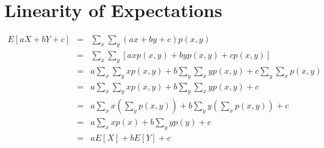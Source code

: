\documentclass[12pt]{article}
\begin{document}
\section*{Linearity of Expectations}
\begin{eqnarray*}
	E[aX+bY+c] &=& \sum_x \sum_y (ax+by+c) p(x,y) \\
		&=& \sum_x \sum_y\left[ axp(x,y) + byp(x,y) + cp(x,y)\right]\\
		&=& a \sum_x \sum_y xp(x,y) + b\sum_y \sum_x y p(x,y) + c \sum_y \sum_x  p(x,y) \\
		&=& a \sum_x \sum_y xp(x,y) + b\sum_y \sum_x y p(x,y) + c\\
				&=& a \sum_{x} x \left(\sum_{y} p(x,y)\right) + b\sum_{y} y \left(\sum_{x}  p(x,y)\right) + c\\
		&=& a\sum_x x p(x) + b\sum_y y  p(y)+c\\
		&=& aE[X] + bE[Y] + c
\end{eqnarray*}
\end{document}
